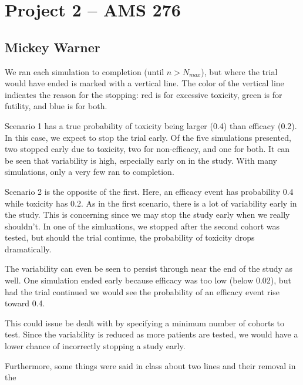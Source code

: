 \documentclass[12pt]{article}
\begin{document}
\section*{Project 2 -- AMS 276}
\subsection*{Mickey Warner}
\bigskip
\bigskip

\noindent We ran each simulation to completion (until $n > N_{max}$), but where the trial would have ended is marked with a vertical line. The color of the vertical line indicates the reason for the stopping: red is for excessive toxicity, green is for futility, and blue is for both.
\bigskip

\noindent Scenario 1 has a true probability of toxicity being larger (0.4) than efficacy (0.2). In this case, we expect to stop the trial early. Of the five simulations presented, two stopped early due to toxicity, two for non-efficacy, and one for both. It can be seen that variability is high, especially early on in the study. With many simulations, only a very few ran to completion.
\bigskip

\noindent Scenario 2 is the opposite of the first. Here, an efficacy event has probability 0.4 while toxicity has 0.2. As in the first scenario, there is a lot of variability early in the study. This is concerning since we may stop the study early when we really shouldn't. In one of the simluations, we stopped after the second cohort was tested, but should the trial continue, the probability of toxicity drops dramatically.
\bigskip

\noindent The variability can even be seen to persist through near the end of the study as well. One simulation ended early because efficacy was too low (below 0.02), but had the trial continued we would see the probability of an efficacy event rise toward 0.4.
\bigskip

\noindent This could issue be dealt with by specifying a minimum number of cohorts to test. Since the variability is reduced as more patients are tested, we would have a lower chance of incorrectly stopping a study early.
\bigskip

\noindent Furthermore, some things were said in class about two lines and their removal in the

\newpage
\end{document}
